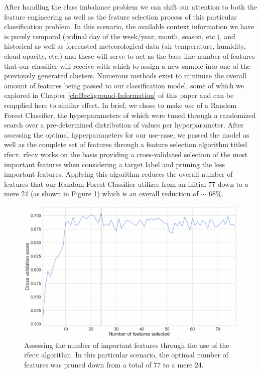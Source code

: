 \noindent \newline After handling the class imbalance problem we can shift our attention to both the feature engineering as well as the feature selection process of this particular classification problem. In this scenario, the available context information we have is purely temporal (ordinal day of the week/year, month, season, etc.), and historical as well as forecasted meteorological data (air temperature, humidity, cloud opacity, etc.) and these will serve to act as the base-line number of features that our classifier will receive with which to assign a new sample into one of the previously generated clusters. Numerous methods exist to minimize the overall amount of features being passed to our classification model, some of which we explored in Chapter \ref{ch:Background-Information} of this paper and can be reapplied here to similar effect. In brief, we chose to make use of a Random Forest Classifier, the hyperparameters of which were tuned through a randomized search over a pre-determined distribution of values per hyperparameter. After assessing the optimal hyperparameters for our use-case, we passed the model as well as the complete set of features through a feature selection algorithm titled \gls{rfecv}. \gls{rfecv} works on the basis providing a cross-validated selection of the most important features when considering a target label and pruning the less important features. Applying this algorithm reduces the overall number of features that our Random Forest Classifier utilizes from an initial 77 down to a mere 24 (as shown in Figure \ref{fig:UCID-RFECV}) which is an overall reduction of $\sim$ 68\%.

\begin{figure}[H]
    \centering
    \includegraphics[width=\textwidth]{Images/Chapter 5/Stage 4/UCID/UCID-RFECV.pdf}
    \caption{Assessing the number of important features through the use of the \gls{rfecv} algorithm. In this particular scenario, the optimal number of features was pruned down from a total of 77 to a mere 24.}
    \label{fig:UCID-RFECV}
\end{figure}

